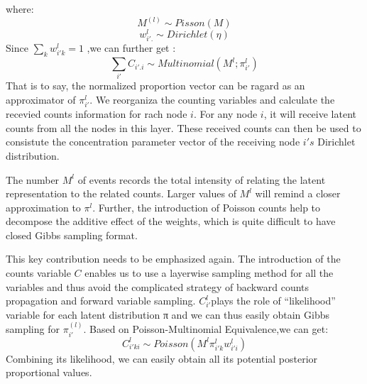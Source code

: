 where:
$$
M^{(l)} \sim Pisson(M)
$$
\[
w_{i'.}^l \sim Dirichlet(\eta)
\]
Since $\sum_k w_{i'k}^l =1$ ,we can further get :
$$
\sum_{i'}{C_{i'.i}} \sim Multinomial(M^{l};\pi_{i'}^l)
$$
That is to say, the normalized proportion vector can be ragard as an approximator of $\pi_{i'}^l$. We reorganiza the counting variables and calculate the recevied counts information for rach node $i$. For any node $i$, it will receive latent counts from all the nodes in this layer. These received counts can then be used to consistute the concentration parameter vector of the receiving node $i's$ Dirichlet distribution.

The number $M^{l}$ of events records the total intensity of relating the latent representation to the related counts. Larger
values of $M^{l}$ will remind a closer approximation to $\pi^{l}$. Further, the introduction of Poisson counts help to decompose the additive effect of the weights, which is quite difficult to have closed Gibbs sampling format.

This key contribution needs to be emphasized again. The
introduction of the counts variable $C$ enables us to use a
layerwise sampling method for all the variables and thus
avoid the complicated strategy of backward counts propagation and forward variable sampling. $C_{i'}^{{l}}$plays the role of “likelihood” variable for each latent distribution π and we can thus easily obtain Gibbs sampling for $\pi_{i'}^{(l)}$.
 Based on Poisson-Multinomial Equivalence,we can get:
 $$C_{i'ki}^{l} \sim Poisson(M^l \pi_{i'k}^l w_{i'i}^l)\tag{3}$$
 Combining its likelihood, we can easily obtain all its potential posterior proportional
 values.



